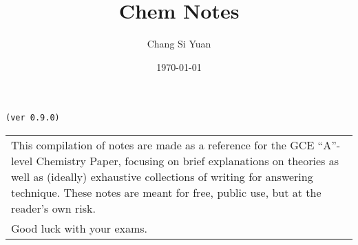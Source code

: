 \documentclass[../main]{subfiles}
\begin{document}
\author{Chang Si Yuan}
\title{Chem Notes}
\date{\today}

\maketitle

\begin{center}

	\texttt{(ver 0.9.0)}

	\vspace{50pt}

	\begin{tabular}{>{\flushleft}p{8cm}}
	This compilation of notes are made as a reference for the GCE ``A''-level Chemistry Paper, focusing on brief explanations on theories as well as (ideally) exhaustive collections of writing for answering technique. These notes are meant for free, public use, but at the reader's own risk. \\
	Good luck with your exams.
	\end{tabular}

\end{center}

\newpage
\end{document}
